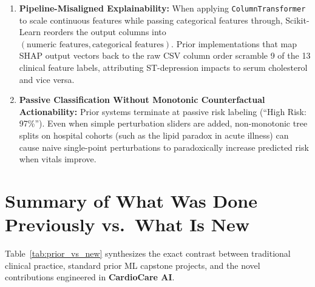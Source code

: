 \documentclass[12pt,a4paper]{report}
\begin{document}
\begin{enumerate}
    \item \textbf{Pipeline-Misaligned Explainability:} When applying \texttt{ColumnTransformer} to scale continuous features while passing categorical features through, Scikit-Learn reorders the output columns into $(\text{numeric features}, \text{categorical features})$. Prior implementations that map SHAP output vectors back to the raw CSV column order scramble 9 of the 13 clinical feature labels, attributing ST-depression impacts to serum cholesterol and vice versa.
    \item \textbf{Passive Classification Without Monotonic Counterfactual Actionability:} Prior systems terminate at passive risk labeling (``High Risk: 97\%''). Even when simple perturbation sliders are added, non-monotonic tree splits on hospital cohorts (such as the lipid paradox in acute illness) can cause naive single-point perturbations to paradoxically increase predicted risk when vitals improve.
\end{enumerate}

\section{Summary of What Was Done Previously vs.\ What Is New}

Table~\ref{tab:prior_vs_new} synthesizes the exact contrast between traditional clinical practice, standard prior ML capstone projects, and the novel contributions engineered in \textbf{CardioCare AI}.
\end{document}
